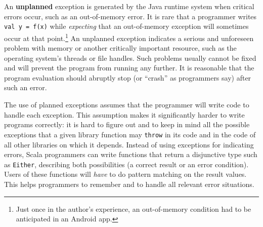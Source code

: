 An \textbf{unplanned} exception is generated
by the Java runtime system when critical errors occur, such as an
out-of-memory error. It is rare that a programmer writes \lstinline!val y = f(x)!
while \emph{expecting} that an out-of-memory exception will sometimes
occur at that point.\footnote{Just once in the author's experience, an out-of-memory condition had
to be anticipated in an Android app.} An unplanned exception indicates a serious and unforeseen problem
with memory or another critically important resource, such as the
operating system's threads or file handles. Such problems usually
cannot be fixed and will prevent the program from running any further.
It is reasonable that the program evaluation should abruptly stop
(or ``crash'' as programmers say) after such an error.

The use of planned exceptions assumes that the programmer will write
code to handle each exception. This assumption makes it significantly
harder to write programs correctly: it is hard to figure out and to
keep in mind all the possible exceptions that a given library function
may \lstinline!throw! in its code and in the code of all other libraries
on which it depends. Instead of using exceptions for indicating errors,
Scala programmers can write functions that return a disjunctive type
such as \lstinline!Either!, describing both possibilities (a correct
result or an error condition). Users of these functions will \emph{have}
to do pattern matching on the result values. This helps programmers
to remember and to handle all relevant error situations.


